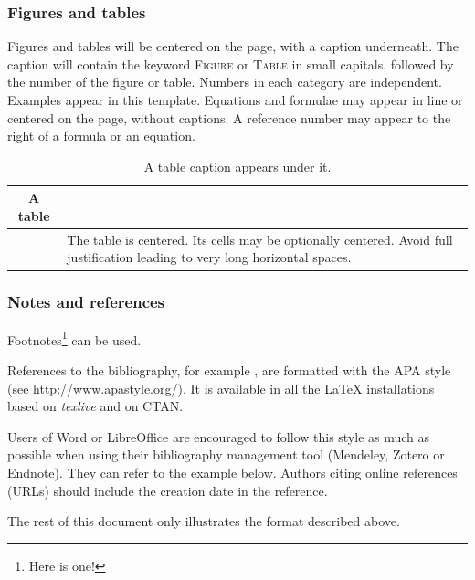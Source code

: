 \documentclass[10pt,a5paper,twoside]{article}
\begin{document}
\subsubsection{Figures and tables}
Figures and tables will be centered on the page, with a caption underneath. The caption will contain the keyword \textsc{Figure} or \textsc{Table} in small capitals, followed by the number of the figure or table. Numbers in each category are independent. Examples appear in this template. Equations and formulae may appear in line or centered on the page, without captions. A reference number may appear to the right of a formula or an equation.

\begin{table}[!h]
\setcounter{table}{0}
\centering
	\begin{tabular}{|c|p{5cm}|}
	\hline
	A table&\\
	\hline
	&The table is centered. Its cells may be optionally centered. Avoid full justification leading to very long horizontal spaces.\\
	\hline
	\end{tabular}
\caption{A table caption appears under it.}\label{Table}
\end{table}
\subsubsection{Notes and references}
Footnotes\footnote{Here is one!} can be used.

References to the bibliography, for example \cite{Bernhard07}, are formatted with the APA style (see \href{http://www.apastyle.org/}{http://www.apastyle.org/}). It is available in all the LaTeX installations based on \emph{texlive} and on CTAN.

Users of Word or LibreOffice are encouraged to follow this style as much as possible when using their bibliography management tool (Mendeley, Zotero or Endnote). They can refer to the example below. Authors citing online references (URLs) should include the creation date in the reference.

The rest of this document only illustrates the format described above.
\end{document}
